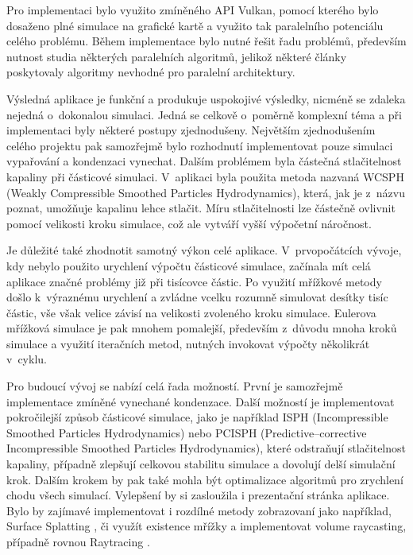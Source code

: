 Pro implementaci bylo využito zmíněného API Vulkan, pomocí kterého bylo dosaženo plné simulace na grafické kartě a využito tak paralelního potenciálu celého problému. Během implementace bylo nutné řešit řadu problémů, především nutnost studia některých paralelních algoritmů, jelikož některé články poskytovaly algoritmy nevhodné pro paralelní architektury.

Výsledná aplikace je funkční a produkuje uspokojivé výsledky, nicméně se zdaleka nejedná o~dokonalou simulaci. Jedná se celkově o~poměrně komplexní téma a při implementaci byly některé postupy zjednodušeny. Největším zjednodušením celého projektu pak samozřejmě bylo rozhodnutí implementovat pouze simulaci vypařování a kondenzaci vynechat. Dalším problémem byla částečná stlačitelnost kapaliny při částicové simulaci. V~aplikaci byla použita metoda nazvaná WCSPH (Weakly Compressible Smoothed Particles Hydrodynamics), která, jak je z~názvu poznat, umožňuje kapalinu lehce stlačit. Míru stlačitelnosti lze částečně ovlivnit pomocí velikosti kroku simulace, což ale vytváří vyšší výpočetní náročnost. 

Je důležité také zhodnotit samotný výkon celé aplikace. V~prvopočátcích vývoje, kdy nebylo použito urychlení výpočtu částicové simulace, začínala mít celá aplikace značné problémy již při tisícovce částic. Po využití mřížkové metody došlo k~výraznému urychlení a zvládne vcelku rozumně simulovat desítky tisíc částic, vše však velice závisí na velikosti zvoleného kroku simulace. Eulerova mřížková simulace je pak mnohem pomalejší, především z~důvodu mnoha kroků simulace a využití iteračních metod, nutných invokovat výpočty několikrát v~cyklu.

Pro budoucí vývoj se nabízí celá řada možností. První je samozřejmě implementace zmíněné vynechané kondenzace. Další možností je implementovat pokročilejší způsob částicové simulace, jako je například ISPH (Incompressible Smoothed Particles Hydrodynamics) nebo PCISPH (Predictive–corrective Incompressible Smoothed Particles Hydrodynamics), které odstraňují stlačitelnost kapaliny, případně zlepšují celkovou stabilitu simulace a dovolují delší simulační krok. Dalším krokem by pak také mohla být optimalizace algoritmů pro zrychlení chodu všech simulací. Vylepšení by si zasloužila i prezentační stránka aplikace. Bylo by zajímavé implementovat i rozdílné metody zobrazovaní jako například, Surface Splatting \cite{surfSplat}, či využít existence mřížky a implementovat volume raycasting, případně rovnou Raytracing \cite{volumeRT}. 



